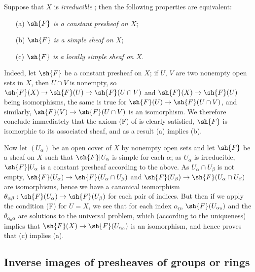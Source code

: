 \begin{env}[3.6.2]
\label{0.3.6.2}
Suppose that $X$ is \emph{irreducible} ; then the following
properties are equivalent:
\begin{enumerate}
  \item[(a)] \emph{$\sh{F}$ is a constant presheaf on $X$};
  \item[(b)] \emph{$\sh{F}$ is a simple sheaf on $X$};
  \item[(c)] \emph{$\sh{F}$ is a locally simple sheaf on $X$}.
\end{enumerate}

Indeed, let $\sh{F}$ be a constant presheaf on $X$; if $U$, $V$ are two nonempty
open sets in $X$, then $U\cap V$ is nonempty, so
$\sh{F}(X)\to\sh{F}(U)\to\sh{F}(U\cap V)$ and $\sh{F}(X)\to\sh{F}(U)$ being
isomorphisms, the same is true for $\sh{F}(U)\to\sh{F}(U\cap V)$, and similarly,
$\sh{F}(V)\to\sh{F}(U\cap V)$ is an isomorphism. We therefore conclude
immediately that the axiom (F) of  is clearly satisfied,
$\sh{F}$ is isomorphic to its associated sheaf, and as a result (a) implies (b).

Now let $(U_\alpha)$ be an open cover of $X$ by nonempty open sets and let
$\sh{F}$ be a sheaf on $X$ such that $\sh{F}|U_\alpha$ is simple for each
$\alpha$; as $U_\alpha$ is irreducible, $\sh{F}|U_\alpha$ is a constant presheaf
according to the above. As $U_\alpha\cap U_\beta$ is not empty,
$\sh{F}(U_\alpha)\to\sh{F}(U_\alpha\cap U_\beta)$ and
$\sh{F}(U_\beta)\to\sh{F}(U_\alpha\cap U_\beta)$ are isomorphisms, hence we have
a canonical isomorphism
$\theta_{\alpha\beta}:\sh{F}(U_\alpha)\to\sh{F}(U_\beta)$ for each pair of
indices. But then if we apply the condition (F) for $U=X$, we see that for each
index $\alpha_0$, $\sh{F}(U_{\alpha_0})$ and the $\theta_{\alpha_0\alpha}$ are
solutions to the universal problem, which (according to the uniqueness) implies
that $\sh{F}(X)\to\sh{F}(U_{\alpha_0})$ is an isomorphism, and hence proves that
(c) implies (a).
\end{env}

\subsection{Inverse images of presheaves of groups or rings}
\label{subsection:0.3.7}

